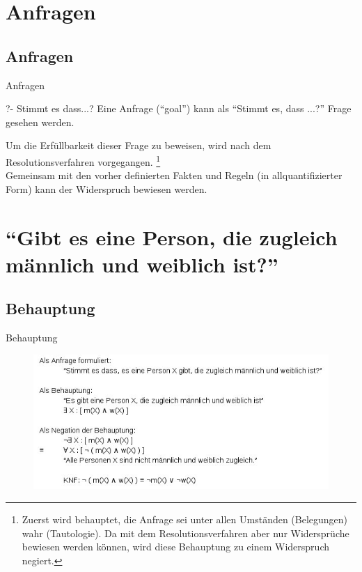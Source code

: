 \documentclass[pdf]{beamer}
\begin{document}
	\section{Anfragen}
	
	
	\subsection{Anfragen}
	
	\begin{frame}{Anfragen}
		\begin{block}{?- Stimmt es dass...?}
			Eine Anfrage (\enquote{goal}) kann als \enquote{Stimmt es, dass ...?} Frage gesehen werden.

		\end{block}
		Um die Erfüllbarkeit dieser Frage zu beweisen, wird nach dem Resolutionsverfahren vorgegangen.
		\footnote{Zuerst wird behauptet, die Anfrage sei unter allen Umständen (Belegungen) wahr (Tautologie).
		Da mit dem Resolutionsverfahren aber nur Widersprüche bewiesen werden können,
		wird diese Behauptung zu einem Widerspruch negiert.} \\
		Gemeinsam mit den vorher definierten Fakten und Regeln (in allquantifizierter Form)
		kann der Widerspruch bewiesen werden.

	\end{frame}

	\section{\enquote{Gibt es eine Person, die zugleich männlich und weiblich ist?}}
	\subsection{Behauptung}
	\begin{frame}{Behauptung}
	
		\begin{figure}[!ht]
  		\includegraphics[width=\textwidth]{img/behauptung}
		\end{figure}
		 
	\end{frame}
	
\end{document}
